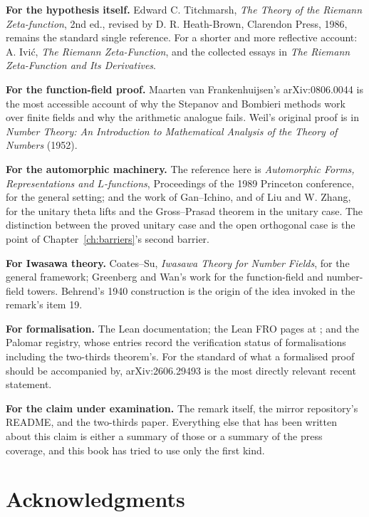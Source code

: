 \textbf{For the hypothesis itself.} Edward C. Titchmarsh, \emph{The Theory of
the Riemann Zeta-function}, 2nd ed., revised by D. R. Heath-Brown, Clarendon
Press, 1986, remains the standard single reference. For a shorter and more
reflective account: A. Ivić, \emph{The Riemann Zeta-Function}, and the
collected essays in \emph{The Riemann Zeta-Function and Its Derivatives}.

\textbf{For the function-field proof.} Maarten van Frankenhuijsen's
arXiv:0806.0044 is the most accessible account of why the Stepanov and
Bombieri methods work over finite fields and why the arithmetic analogue
fails. Weil's original proof is in \emph{Number Theory: An Introduction to
Mathematical Analysis of the Theory of Numbers} (1952).

\textbf{For the automorphic machinery.} The reference here is
\emph{Automorphic Forms, Representations and $L$-functions}, Proceedings of
the 1989 Princeton conference, for the general setting; and the work of
Gan--Ichino, and of Liu and W. Zhang, for the unitary theta lifts and the
Gross--Prasad theorem in the unitary case. The distinction between the
proved unitary case and the open orthogonal case is the point of Chapter~\ref{ch:barriers}'s
second barrier.

\textbf{For Iwasawa theory.} Coates--Su, \emph{Iwasawa Theory for Number
Fields}, for the general framework; Greenberg and Wan's work for the
function-field and number-field towers. Behrend's 1940 construction is the
origin of the idea invoked in the remark's item 19.

\textbf{For formalisation.} The Lean documentation; the Lean FRO pages at
; and the Palomar registry, whose entries
record the verification status of formalisations including the two-thirds
theorem's. For the standard of what a formalised proof should be accompanied
by, arXiv:2606.29493 is the most directly relevant recent statement.

\textbf{For the claim under examination.} The remark itself, the mirror
repository's README, and the two-thirds paper. Everything else that has been
written about this claim is either a summary of those or a summary of the
press coverage, and this book has tried to use only the first kind.

\printindex

\chapter*{Acknowledgments}
\thispagestyle{plain}

